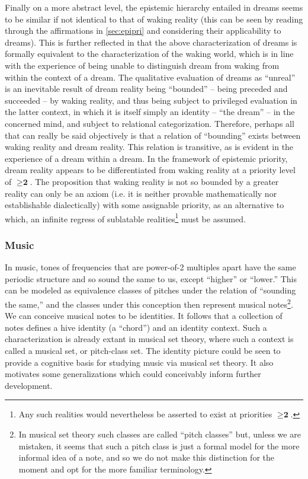 \documentclass[pra,twocolumn,groupedaddress,10pt]{revtex4}
\theoremstyle{definition}
\begin{document}
Finally on a more abstract level, the epistemic hierarchy entailed in dreams seems to be similar if not identical to that of waking reality (this can be seen by reading through the affirmations in \autoref{sec:epipri} and considering their applicability to dreams). This is further reflected in that the above characterization of dreams is formally equivalent to the characterization of the waking world, which is in line with the experience of being unable to distinguish dream from waking from within the context of a dream. The qualitative evaluation of dreams as ``unreal'' is an inevitable result of dream reality being ``bounded'' -- being preceded and succeeded -- by waking reality, and thus being subject to privileged evaluation in the latter context, in which it is itself simply an identity -- ``the dream'' -- in the concerned mind, and subject to relational categorization. Therefore, perhaps all that can really be said objectively is that a relation of ``bounding'' exists between waking reality and dream reality. This relation is transitive, as is evident in the experience of a dream within a dream. In the framework of epistemic priority, dream reality appears to be differentiated from waking reality at a priority level of $\ge \textbf{2}$. The proposition that waking reality is not so bounded by a greater reality can only be an axiom (i.e. it is neither provable mathematically nor establishable dialectically) with some assignable priority, as an alternative to which, an infinite regress of sublatable realities\footnote{Any such realities would nevertheless be asserted to exist at priorities $\ge \textbf{2}$.} must be assumed.

\subsubsection{Music} \label{sec:music}

In music, tones of frequencies that are power-of-2 multiples apart have the same periodic structure and so sound the same to us, except ``higher'' or ``lower.'' This can be modeled as equivalence classes of pitches under the relation of ``sounding the same,'' and the classes under this conception then represent musical notes\footnote{In musical set theory such classes are called ``pitch classes'' but, unless we are mistaken, it seems that such a pitch class is just a formal model for the more informal idea of a note, and so we do not make this distinction for the moment and opt for the more familiar terminology.}. We can conceive musical notes to be identities. It follows that a collection of notes defines a hive identity (a ``chord'') and an identity context. Such a characterization is already extant in musical set theory\cite{musicalsettheory}, where such a context is called a musical set, or pitch-class set. The identity picture could be seen to provide a cognitive basis for studying music via musical set theory. It also motivates some generalizations which could conceivably inform further development.
\end{document}
